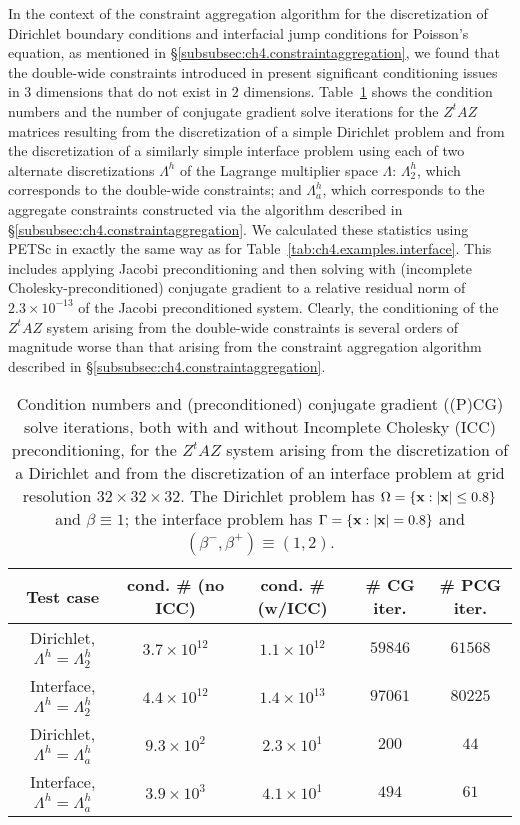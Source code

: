 In the context of the constraint aggregation algorithm for the discretization of Dirichlet boundary conditions and interfacial jump conditions for Poisson's equation, as mentioned in \S\ref{subsubsec:ch4.constraintaggregation}, we found that the double-wide constraints introduced in \cite{Bedrossian10} present significant conditioning issues in $3$ dimensions that do not exist in $2$ dimensions. Table~\ref{tab:pt2.constraintconditioning} shows the condition numbers and the number of conjugate gradient solve iterations for the $Z^tAZ$ matrices resulting from the discretization of a simple Dirichlet problem and from the discretization of a similarly simple interface problem using each of two alternate discretizations $\Lambda^h$ of the Lagrange multiplier space $\Lambda$: $\Lambda^h_2$, which corresponds to the double-wide constraints; and $\Lambda^h_a$, which corresponds to the aggregate constraints constructed via the algorithm described in \S\ref{subsubsec:ch4.constraintaggregation}. We calculated these statistics using PETSc in exactly the same way as for Table~\ref{tab:ch4.examples.interface}. This includes applying Jacobi preconditioning and then solving with (incomplete Cholesky-preconditioned) conjugate gradient to a relative residual norm of $2.3 \times 10^{-13}$ of the Jacobi preconditioned system. Clearly, the conditioning of the $Z^tAZ$ system arising from the double-wide constraints is several orders of magnitude worse than that arising from the constraint aggregation algorithm described in \S\ref{subsubsec:ch4.constraintaggregation}.

\begin{table}[htbp]
\begin{center}
\begin{tabular}{|c|c|c|c|c|}
\hline
Test case & cond. \# (no ICC) & cond. \# (w/ICC) & \# CG iter. & \# PCG iter. \\
\hline
Dirichlet, $\Lambda^h = \Lambda^h_2$ & $3.7 \times 10^{12}$ & $1.1 \times 10^{12}$ & $59846$ & $61568$ \\
Interface, $\Lambda^h = \Lambda^h_2$ & $4.4 \times 10^{12}$ & $1.4 \times 10^{13}$ & $97061$ & $80225$ \\
Dirichlet, $\Lambda^h = \Lambda^h_a$ & $9.3 \times 10^{ 2}$ & $2.3 \times 10^{ 1}$ &   $200$ &    $44$ \\
Interface, $\Lambda^h = \Lambda^h_a$ & $3.9 \times 10^{ 3}$ & $4.1 \times 10^{ 1}$ &   $494$ &    $61$ \\
\hline
\end{tabular}
\end{center}
\caption{Condition numbers and (preconditioned) conjugate gradient ((P)CG) solve iterations, both with and without Incomplete Cholesky (ICC) preconditioning, for the $Z^tAZ$ system arising from the discretization of a Dirichlet and from the discretization of an interface problem at grid resolution $32 \times 32 \times 32$. The Dirichlet problem has $\Omega = \{\mathbf{x} : \left\lvert \mathbf{x} \right\rvert \leq 0.8\}$ and $\beta \equiv 1$; the interface problem has $\Gamma = \{\mathbf{x} : \left\lvert \mathbf{x} \right\rvert = 0.8\}$ and $(\beta^-, \beta^+) \equiv (1, 2)$.}
\label{tab:pt2.constraintconditioning}
\end{table}
